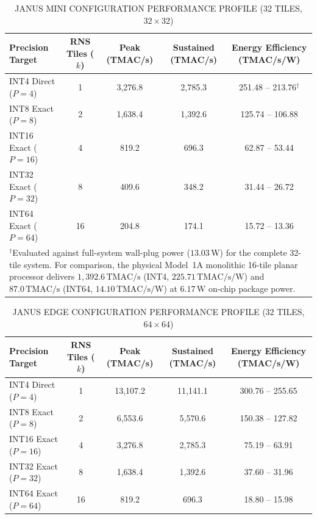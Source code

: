 \documentclass[journal]{IEEEtran}
\begin{document}
\begin{table}[htbp]
\centering
\small
\setlength{\tabcolsep}{3pt}
\caption{JANUS MINI CONFIGURATION PERFORMANCE PROFILE (32 TILES, $32 \times 32$)}
\label{tab:table16}
\begin{tabular}{lcccc}
\toprule
Precision Target & RNS Tiles ($k$) & Peak (TMAC/s) & Sustained (TMAC/s) & Energy Efficiency (TMAC/s/W) \\
\midrule
INT4 Direct ($P=4$) & 1 & 3,276.8 & 2,785.3 & 251.48 -- 213.76$^\dagger$ \\
INT8 Exact ($P=8$) & 2 & 1,638.4 & 1,392.6 & 125.74 -- 106.88 \\
INT16 Exact ($P=16$) & 4 & 819.2 & 696.3 & 62.87 -- 53.44 \\
INT32 Exact ($P=32$) & 8 & 409.6 & 348.2 & 31.44 -- 26.72 \\
INT64 Exact ($P=64$) & 16 & 204.8 & 174.1 & 15.72 -- 13.36 \\
\bottomrule
\multicolumn{5}{p{0.92\textwidth}}{\scriptsize $^\dagger$Evaluated against full-system wall-plug power ($13.03\,\mathrm{W}$) for the complete 32-tile system. For comparison, the physical Model~1A monolithic 16-tile planar processor delivers $1,392.6\,\mathrm{TMAC/s}$ (INT4, $225.71\,\mathrm{TMAC/s/W}$) and $87.0\,\mathrm{TMAC/s}$ (INT64, $14.10\,\mathrm{TMAC/s/W}$) at $6.17\,\mathrm{W}$ on-chip package power.} \\
\end{tabular}
\end{table}

\begin{table}[htbp]
\centering
\small
\setlength{\tabcolsep}{3pt}
\caption{JANUS EDGE CONFIGURATION PERFORMANCE PROFILE (32 TILES, $64 \times 64$)}
\label{tab:table17}
\begin{tabular}{lcccc}
\toprule
Precision Target & RNS Tiles ($k$) & Peak (TMAC/s) & Sustained (TMAC/s) & Energy Efficiency (TMAC/s/W) \\
\midrule
INT4 Direct ($P=4$) & 1 & 13,107.2 & 11,141.1 & 300.76 -- 255.65 \\
INT8 Exact ($P=8$) & 2 & 6,553.6 & 5,570.6 & 150.38 -- 127.82 \\
INT16 Exact ($P=16$) & 4 & 3,276.8 & 2,785.3 & 75.19 -- 63.91 \\
INT32 Exact ($P=32$) & 8 & 1,638.4 & 1,392.6 & 37.60 -- 31.96 \\
INT64 Exact ($P=64$) & 16 & 819.2 & 696.3 & 18.80 -- 15.98 \\
\bottomrule
\end{tabular}
\end{table}
\end{document}

